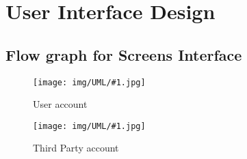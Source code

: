 \documentclass[../DD0.tex]{subfiles}
\begin{document}
\newcommand{\fetchUML}[4] {

  \begin{figure}[h!]

    \centering
    \hspace*{-#4cm}
    \texttt{[image: img/UML/\#1.jpg]}
    \caption{#2}
    \label{fig:#1}

  \end{figure}

}

\section {User Interface Design}
\label{sec:ui}
\subsection{Flow graph for Screens Interface}

\label{sec:userdes}

    \fetchUML
      {User}
      {User account}
      {1}           %
      {0}           %

  \clearpage

\label{sec:thirdpartydes}

    \fetchUML
      {Third_Party}
      {Third Party account}
      {1}           %
      {0}           %


\end{document}
